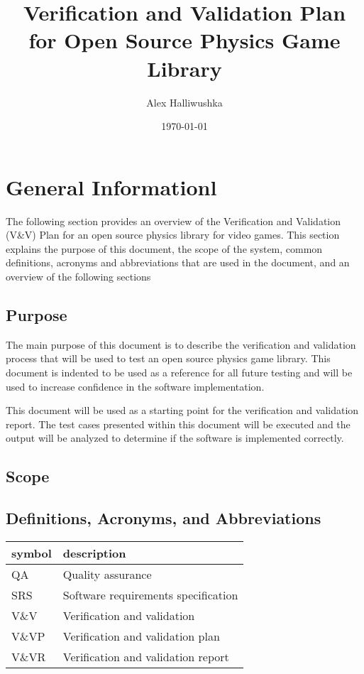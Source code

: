 \documentclass[12pt]{article}
\begin{document}
\title{Verification and Validation Plan for Open Source Physics Game Library} 
\author{Alex Halliwushka}
\date{\today}
	
\maketitle

\tableofcontents

%
%

\section{General Informationl}
The following section provides an overview of the Verification and Validation (V\&V) Plan 
for an open source physics library for video games. This section explains the purpose of this
document, the scope of the system, common definitions, acronyms and abbreviations that are used
in the document, and an overview of the following sections

\subsection{Purpose}
The main purpose of this document is to describe the verification and validation 
process that will be used to test an open source physics game library.
This document is indented to be used as a reference for all future testing and will
be used to increase confidence in the software implementation.  

This document will be used as a starting point for the verification and validation report. The 
test cases presented within this document will be executed and the output will be analyzed to 
determine if the software is implemented correctly.  


\subsection{Scope}


\subsection{Definitions, Acronyms, and Abbreviations }

\renewcommand{\arraystretch}{1.2}
\begin{tabular}{l l} 
  \toprule		
  \textbf{symbol} & \textbf{description}\\
  \midrule 
  QA		&Quality assurance\\
  SRS		&Software requirements specification\\
  V\&V		& Verification and validation\\
  V\&VP 	& Verification and validation plan\\
  V\&VR 	& Verification and validation report\\
  \bottomrule
\end{tabular}\\
\end{document}
